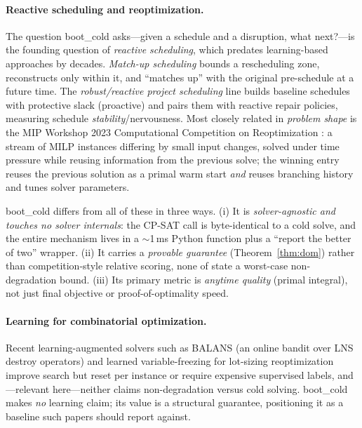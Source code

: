\documentclass[11pt]{article}                        %
\begin{document}
\paragraph{Reactive scheduling and reoptimization.}
The question boot\_cold asks---given a schedule and a disruption, what next?---is
the founding question of \emph{reactive scheduling}, which predates
learning-based approaches by decades. \emph{Match-up scheduling}
\cite{bean1991} bounds a rescheduling zone, reconstructs only within it, and
``matches up'' with the original pre-schedule at a future time. The
\emph{robust/reactive project scheduling} line \cite{herroelen2004,herroelen2005}
builds baseline schedules with protective slack (proactive) and pairs them
with reactive repair policies, measuring schedule \emph{stability}/nervousness.
Most closely related in \emph{problem shape} is the MIP Workshop 2023
Computational Competition on Reoptimization \cite{mipcc2023}: a stream of MILP
instances differing by small input changes, solved under time pressure while
reusing information from the previous solve; the winning entry
\cite{patel2023} reuses the previous solution as a primal warm start
\emph{and} reuses branching history and tunes solver parameters.

boot\_cold differs from all of these in three ways. (i) It is
\emph{solver-agnostic and touches no solver internals}: the CP-SAT call is
byte-identical to a cold solve, and the entire mechanism lives in a
$\sim$1\,ms Python function plus a ``report the better of two'' wrapper.
(ii) It carries a \emph{provable guarantee} (Theorem~\ref{thm:dom}) rather
than competition-style relative scoring, none of \cite{bean1991,herroelen2004,mipcc2023}
state a worst-case non-degradation bound. (iii) Its primary metric is
\emph{anytime quality} (primal integral), not just final objective or
proof-of-optimality speed.

\paragraph{Learning for combinatorial optimization.}
Recent learning-augmented solvers such as BALANS \cite{balans2025} (an online
bandit over LNS destroy operators) and learned variable-freezing for lot-sizing
reoptimization improve search but reset per instance or require expensive
supervised labels, and---relevant here---neither claims non-degradation versus
cold solving. boot\_cold makes \emph{no} learning claim; its value is a
structural guarantee, positioning it as a baseline such papers should report
against.
\end{document}
